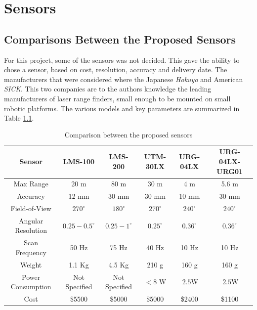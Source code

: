 

\chapter{Sensors}
\label{chap3-sensors}

\section{Comparisons Between the Proposed Sensors}
For this project, some of the sensors was not decided. This gave the ability to chose a
sensor, based on cost, resolution, accuracy and delivery date. The manufacturers that were
considered where the Japanese \emph{Hokuyo} and American \emph{SICK}. This two companies are to the
authors knowledge the leading manufacturers of laser range finders, small enough to be
mounted on small robotic platforms. The various models and key parameters are summarized
in Table \ref{chap3:tab-sensors}.
\begin{table}[htbp]
    \begin{tabular}{|c|c|c|c|c|c|}
        \hline
        Sensor              & LMS-100 & LMS-200 & UTM-30LX & URG-04LX & URG-04LX-URG01 \\
        \hline
        Max Range           & 20 m    & 80 m    & 30 m     & 4 m      & 5.6 m          \\
        Accuracy            & 12 mm   & 30 mm   & 30 mm    & 10 mm    & 30 mm          \\
        Field-of-View       & $270^\circ$ &$180^\circ$  & $270^\circ$ & $240^\circ$ & $240^\circ$  \\
        Angular Resolution  & $0.25-0.5^\circ$  & $0.25-1^\circ$ & $0.25^\circ$ & $0.36^\circ$ & $0.36^\circ$  \\
        Scan Frequency      & 50 Hz   & 75 Hz   &  40 Hz   & 10 Hz    & 10 Hz          \\
        Weight              & 1.1 Kg  & 4.5 Kg  & 210 g    & 160 g    & 160 g          \\
        Power Consumption   & Not Specified & Not Specified  & $<8 $ W & $~2.5$W  &$~2.5$W  \\
        \hline
        Cost                & \$5500  & \$5000  & \$5000   & \$2400   & \$1100         \\
        \hline
    \end{tabular}
    \caption{Comparison between the proposed sensors}
    \label{chap3:tab-sensors}
\end{table}

